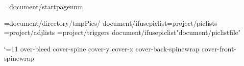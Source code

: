 \def\RHevenleft{{{header/evenleft}}}
\def\RHevencenter{{{header/evencenter}}}
\def\RHevenright{{{header/evenright}}}

\def\RHoddleft{{{header/oddleft}}}
\def\RHoddcenter{{{header/oddcenter}}}
\def\RHoddright{{{header/oddright}}}

\def\RHnoVevenleft{{{header/noVevenleft}}}
\def\RHnoVevencenter{{{header/noVevencenter}}}
\def\RHnoVevenright{{{header/noVevenright}}}

\def\RHnoVoddleft{{{header/noVoddleft}}}
\def\RHnoVoddcenter{{{header/noVoddcenter}}}
\def\RHnoVoddright{{{header/noVoddright}}}


\def\RFoddcenter{{{footer/oddcenter}}}
\def\RFevencenter{{{footer/oddcenter}}}
\def\RFtitleevencenter{{{footer/titleevencenter}}}
\def\RFtitleoddcenter{{{footer/titleoddcenter}}}
\def\RFnoVoddcenter{{{footer/oddcenter}}}
\def\RFnoVevencenter{{{footer/oddcenter}}}

  
\pageno={document/startpagenum}

\PicPath={{{document/directory}/tmpPics/}}
{document/ifusepiclist}\PicListPath={{{project/piclists}}}
\AdjListPath={{{project/adjlists}}}
\TrigListPath={{{project/triggers}}}
{document/ifusepiclist}\openpiclist "{document/piclistfile}"

\catcode`\@=11
\def\tmp{{{cover/coverartbleed}mm}}   %
\expandafter\edef\csname cover-bleed   %
\expandafter\edef\csname cover-spine   %
\expandafter\xdef\csname cover-y\endcsname{{\the\PaperHeight}} %
\expandafter\xdef\csname cover-x\endcsname{{\the\PaperWidth}} %
\expandafter\edef\csname cover-back-spinewrap %
\expandafter\edef\csname cover-front-spinewrap %

